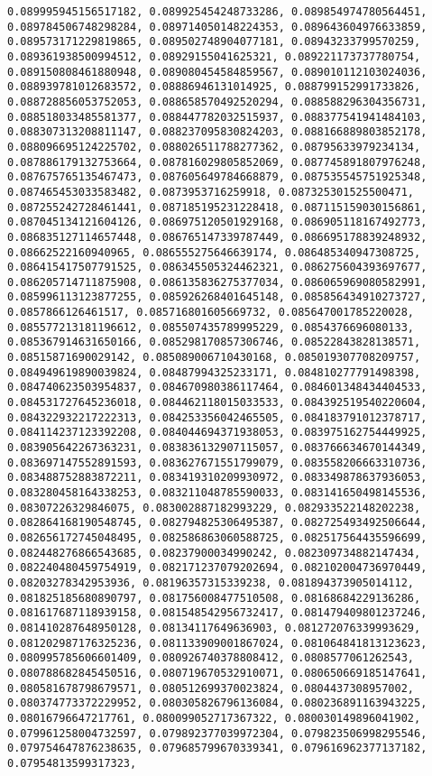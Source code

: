 \documentclass[11pt]{article}
\begin{document}
\begin{Verbatim}[commandchars=\\\{\}]
0.089995945156517182, 0.089925454248733286, 0.089854974780564451, 0.089784506748298284, 0.089714050148224353, 0.089643604976633859, 0.089573171229819865, 0.089502748904077181, 0.08943233799570259, 0.089361938500994512, 0.08929155041625321, 0.089221173737780754, 0.089150808461880948, 0.089080454584859567, 0.089010112103024036, 0.088939781012683572, 0.08886946131014925, 0.088799152991733826, 0.088728856053752053, 0.088658570492520294, 0.088588296304356731, 0.088518033485581377, 0.088447782032515937, 0.088377541941484103, 0.088307313208811147, 0.088237095830824203, 0.088166889803852178, 0.088096695124225702, 0.088026511788277362, 0.08795633979234134, 0.087886179132753664, 0.087816029805852069, 0.087745891807976248, 0.087675765135467473, 0.087605649784668879, 0.087535545751925348, 0.087465453033583482, 0.0873953716259918, 0.087325301525500471, 0.087255242728461441, 0.087185195231228418, 0.087115159030156861, 0.087045134121604126, 0.086975120501929168, 0.086905118167492773, 0.086835127114657448, 0.086765147339787449, 0.086695178839248932, 0.08662522160940965, 0.086555275646639174, 0.086485340947308725, 0.086415417507791525, 0.086345505324462321, 0.086275604393697677, 0.086205714711875908, 0.086135836275377034, 0.086065969080582991, 0.085996113123877255, 0.085926268401645148, 0.085856434910273727, 0.0857866126461517, 0.085716801605669732, 0.085647001785220028, 0.085577213181196612, 0.085507435789995229, 0.0854376696080133, 0.085367914631650166, 0.085298170857306746, 0.08522843828138571, 0.08515871690029142, 0.085089006710430168, 0.085019307708209757, 0.084949619890039824, 0.08487994325233171, 0.084810277791498398, 0.084740623503954837, 0.084670980386117464, 0.084601348434404533, 0.084531727645236018, 0.084462118015033533, 0.084392519540220604, 0.084322932217222313, 0.084253356042465505, 0.084183791012378717, 0.084114237123392208, 0.084044694371938053, 0.083975162754449925, 0.083905642267363231, 0.083836132907115057, 0.083766634670144349, 0.083697147552891593, 0.083627671551799079, 0.083558206663310736, 0.083488752883872211, 0.083419310209930972, 0.083349878637936053, 0.083280458164338253, 0.083211048785590033, 0.083141650498145536, 0.08307226329846075, 0.083002887182993229, 0.082933522148202238, 0.082864168190548745, 0.082794825306495387, 0.082725493492506644, 0.082656172745048495, 0.082586863060588725, 0.082517564435596699, 0.082448276866543685, 0.08237900034990242, 0.082309734882147434, 0.082240480459754919, 0.082171237079202694, 0.082102004736970449, 0.08203278342953936, 0.08196357315339238, 0.081894373905014112, 0.081825185680890797, 0.081756008477510508, 0.08168684229136286, 0.081617687118939158, 0.081548542956732417, 0.081479409801237246, 0.081410287648950128, 0.08134117649636903, 0.081272076339993629, 0.081202987176325236, 0.081133909001867024, 0.081064841813123623, 0.080995785606601409, 0.080926740378808412, 0.0808577061262543, 0.080788682845450516, 0.080719670532910071, 0.080650669185147641, 0.080581678798679571, 0.080512699370023824, 0.0804437308957002, 0.080374773372229952, 0.080305826796136084, 0.080236891163943225, 0.08016796647217761, 0.080099052717367322, 0.080030149896041902, 0.079961258004732597, 0.079892377039972304, 0.079823506998295546, 0.079754647876238635, 0.079685799670339341, 0.079616962377137182, 0.07954813599317323, 
\end{Verbatim}
\end{document}
